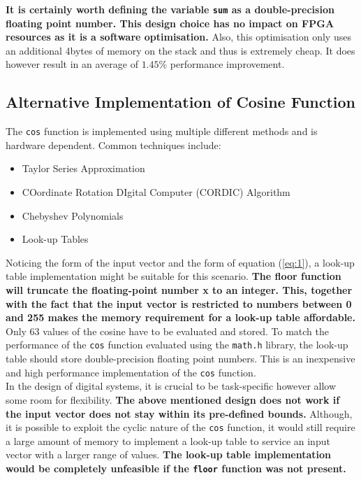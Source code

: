 \documentclass{article}
\begin{document}
\textbf{It is certainly worth defining the variable {\tt sum} as a double-precision floating point number. This design choice has no impact on FPGA resources as it is a software optimisation.} Also, this optimisation only uses an additional 4bytes of memory on the stack and thus is extremely cheap. It does however result in an average of $1.45\%$ performance improvement.\\


\subsection{Alternative Implementation of Cosine Function}
The {\tt cos} function is implemented using multiple different methods and is hardware dependent. Common techniques include:
\begin{itemize}
    \item Taylor Series Approximation
    \item COordinate Rotation DIgital Computer (CORDIC) Algorithm
    \item Chebyshev Polynomials
    \item Look-up Tables\\
\end{itemize}

Noticing the form of the input vector and the form of equation (\ref{eq:1}), a look-up table implementation might be suitable for this scenario. \textbf{The floor function will truncate the floating-point number x to an integer. This, together with the fact that the input vector is restricted to numbers between 0 and 255 makes the memory requirement for a look-up table affordable.} Only 63 values of the cosine have to be evaluated and stored. To match the performance of the {\tt cos} function evaluated using the {\tt math.h} library, the look-up table should store double-precision floating point numbers. This is an inexpensive and high performance implementation of the {\tt cos} function.\\

In the design of digital systems, it is crucial to be task-specific however allow some room for flexibility. \textbf{The above mentioned design does not work if the input vector does not stay within its pre-defined bounds.} Although, it is possible to exploit the cyclic nature of the {\tt cos} function, it would still require a large amount of memory to implement a look-up table to service an input vector with a larger range of values. \textbf{The look-up table implementation would be completely unfeasible if the {\tt floor} function was not present.}\\ 
\end{document}
